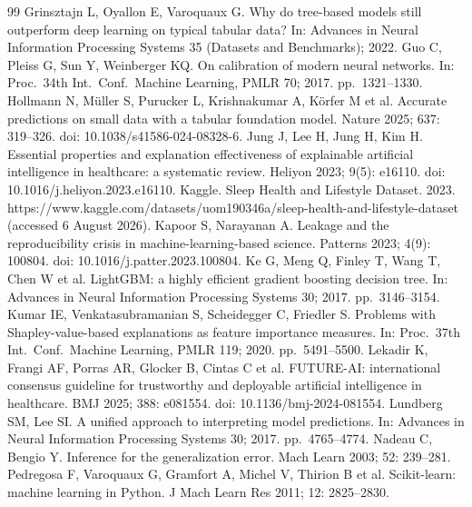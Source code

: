 \documentclass[11pt,a4paper]{article}
\begin{document}
\begin{thebibliography}{99}
 Grinsztajn L, Oyallon E, Varoquaux G. Why do tree-based models still outperform deep learning on typical tabular data? In: Advances in Neural Information Processing Systems 35 (Datasets and Benchmarks); 2022.
 Guo C, Pleiss G, Sun Y, Weinberger KQ. On calibration of modern neural networks. In: Proc.\ 34th Int.\ Conf.\ Machine Learning, PMLR 70; 2017. pp.\ 1321--1330.
 Hollmann N, M{\"u}ller S, Purucker L, Krishnakumar A, K{\"o}rfer M et al. Accurate predictions on small data with a tabular foundation model. Nature 2025; 637: 319--326. doi: 10.1038/s41586-024-08328-6.
 Jung J, Lee H, Jung H, Kim H. Essential properties and explanation effectiveness of explainable artificial intelligence in healthcare: a systematic review. Heliyon 2023; 9(5): e16110. doi: 10.1016/j.heliyon.2023.e16110.
 Kaggle. Sleep Health and Lifestyle Dataset. 2023. https://www.kaggle.com/datasets/uom190346a/sleep-health-and-lifestyle-dataset (accessed 6 August 2026).
 Kapoor S, Narayanan A. Leakage and the reproducibility crisis in machine-learning-based science. Patterns 2023; 4(9): 100804. doi: 10.1016/j.patter.2023.100804.
 Ke G, Meng Q, Finley T, Wang T, Chen W et al. LightGBM: a highly efficient gradient boosting decision tree. In: Advances in Neural Information Processing Systems 30; 2017. pp.\ 3146--3154.
 Kumar IE, Venkatasubramanian S, Scheidegger C, Friedler S. Problems with Shapley-value-based explanations as feature importance measures. In: Proc.\ 37th Int.\ Conf.\ Machine Learning, PMLR 119; 2020. pp.\ 5491--5500.
 Lekadir K, Frangi AF, Porras AR, Glocker B, Cintas C et al. FUTURE-AI: international consensus guideline for trustworthy and deployable artificial intelligence in healthcare. BMJ 2025; 388: e081554. doi: 10.1136/bmj-2024-081554.
 Lundberg SM, Lee SI. A unified approach to interpreting model predictions. In: Advances in Neural Information Processing Systems 30; 2017. pp.\ 4765--4774.
 Nadeau C, Bengio Y. Inference for the generalization error. Mach Learn 2003; 52: 239--281.
 Pedregosa F, Varoquaux G, Gramfort A, Michel V, Thirion B et al. Scikit-learn: machine learning in Python. J Mach Learn Res 2011; 12: 2825--2830.

\end{thebibliography}
\end{document}
